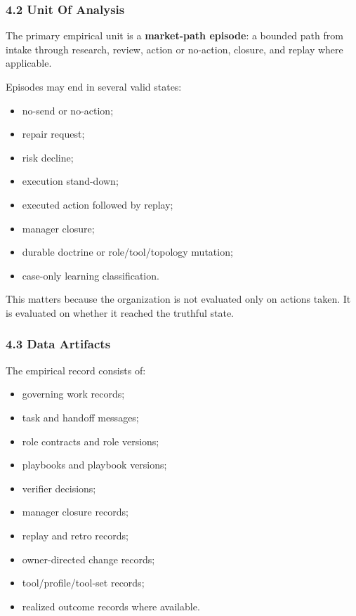 \documentclass[
]{article}
\providecommand{\tightlist}{%
  \setlength{\itemsep}{0pt}\setlength{\parskip}{0pt}}
\begin{document}
\subsubsection{4.2 Unit Of Analysis}\label{unit-of-analysis}

The primary empirical unit is a \textbf{market-path episode}: a bounded path from intake through research, review, action or no-action, closure, and replay where applicable.

Episodes may end in several valid states:

\begin{itemize}
\tightlist
\item
  no-send or no-action;
\item
  repair request;
\item
  risk decline;
\item
  execution stand-down;
\item
  executed action followed by replay;
\item
  manager closure;
\item
  durable doctrine or role/tool/topology mutation;
\item
  case-only learning classification.
\end{itemize}

This matters because the organization is not evaluated only on actions taken. It is evaluated on whether it reached the truthful state.

\subsubsection{4.3 Data Artifacts}\label{data-artifacts}

The empirical record consists of:

\begin{itemize}
\tightlist
\item
  governing work records;
\item
  task and handoff messages;
\item
  role contracts and role versions;
\item
  playbooks and playbook versions;
\item
  verifier decisions;
\item
  manager closure records;
\item
  replay and retro records;
\item
  owner-directed change records;
\item
  tool/profile/tool-set records;
\item
  realized outcome records where available.
\end{itemize}
\end{document}
